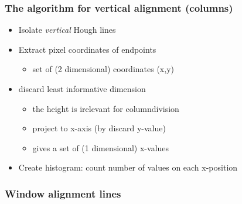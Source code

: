 \documentclass{beamer}
\begin{document}
\frame
{
	\frametitle{The algorithm for vertical alignment (columns)}
	\begin{itemize}
	\item <+-| alert@+> Isolate \emph{vertical} Hough lines
	\item <+-| alert@+> Extract pixel coordinates of endpoints 
		\begin{itemize}
		\item <+-| alert@+> set of (2 dimensional) coordinates (x,y)
		\end{itemize}
	\item <+-| alert@+> discard least informative dimension
		\begin{itemize}
		\item <+-| alert@+> the height is irelevant for columndivision
		\item <+-| alert@+> project to x-axis (by discard y-value) 
		\item <+-| alert@+> gives a set of (1 dimensional) x-values 
		\end{itemize}
	\item <+-| alert@+> Create histogram: count number of values on each x-position
	\end{itemize}
}

\frame
{
	\frametitle{Window alignment lines}
}
\end{document}
